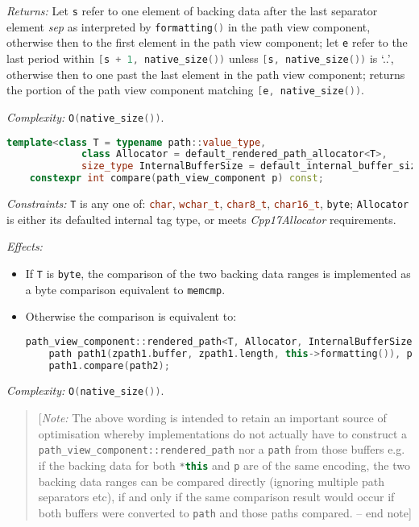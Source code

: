 \documentclass[11pt]{article}
\newcommand{\code}[2][cpp]{\lstinline[language=#1,basicstyle=\small\ttfamily]{#2}}
\newcommand{\desc}[1]{\textit{#1}}
\newcommand{\constraints}{\desc{Constraints: }}
\newcommand{\effects}{\desc{Effects: }}
\newcommand{\returns}{\desc{Returns: }}
\newcommand{\complexity}{\desc{Complexity: }}
\newcommand{\note}[1]{\begin{quote}[\textit{Note:} #1 -- end note]\end{quote}}
\begin{document}
\returns Let \code{s} refer to one element of backing data after the last separator element \emph{sep} as interpreted by \code{formatting()} in the path view component, otherwise then to the first element in the path view component; let \code{e} refer to the last period within \code{[s + 1, native_size())} unless \code{[s, native_size())} is `..', otherwise then to one past the last element in the path view component; returns the portion of the path view component matching \code{[e, native_size())}.

\complexity \code{O(native_size())}.\\

\begin{lstlisting}[language=cpp]
    template<class T = typename path::value_type,
             class Allocator = default_rendered_path_allocator<T>,
             size_type InternalBufferSize = default_internal_buffer_size>
    constexpr int compare(path_view_component p) const;
\end{lstlisting}

\constraints \code{T} is any one of: \code{char}, \code{wchar_t}, \code{char8_t}, \code{char16_t}, \code{byte}; \code{Allocator} is either its defaulted internal tag type, or meets \emph{Cpp17Allocator} requirements.

\effects
\begin{itemize}
    \item If \code{T} is \code{byte}, the comparison of the two backing data ranges is implemented as a byte comparison equivalent to \code{memcmp}.
    \item Otherwise the comparison is equivalent to:
    \begin{lstlisting}[language=cpp]
    path_view_component::rendered_path<T, Allocator, InternalBufferSize> zpath1(*this), zpath2(p);
    path path1(zpath1.buffer, zpath1.length, this->formatting()), path2(zpath2.buffer, zpath2.length, p.formatting());
    path1.compare(path2);
    \end{lstlisting}
\end{itemize}

\complexity \code{O(native_size())}.\\

\color{black}

\note{The above wording is intended to retain an important source of optimisation whereby implementations do not actually have to construct a \code{path_view_component::rendered_path} nor a \code{path} from those buffers e.g. if the backing data for both \code{*this} and \code{p} are of the same encoding, the two backing data ranges can be compared directly (ignoring multiple path separators etc), if and only if the same comparison result would occur if both buffers were converted to \code{path} and those paths compared.}
\end{document}
